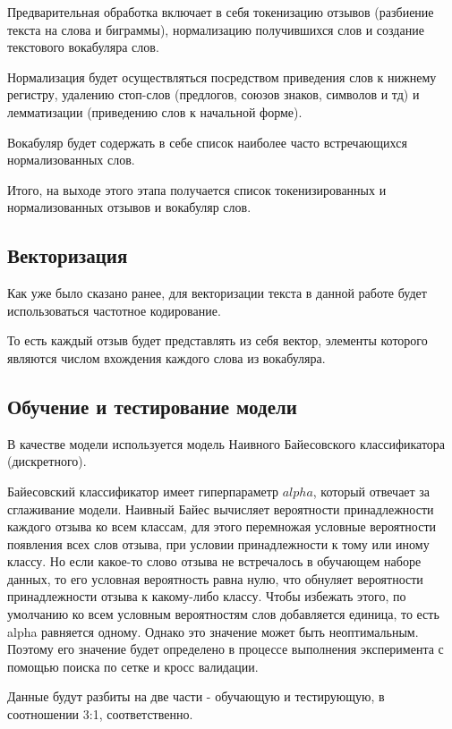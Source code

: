 \documentclass[a4paper,12pt]{article}
\begin{document}
	Предварительная обработка включает в себя токенизацию отзывов (разбиение текста на слова и биграммы), нормализацию получившихся слов и создание текстового вокабуляра слов.
	
	Нормализация будет осуществляться посредством приведения слов к нижнему регистру, удалению стоп-слов (предлогов, союзов знаков, символов и тд) и лемматизации (приведению слов к начальной форме).
	
	Вокабуляр будет содержать в себе список наиболее часто встречающихся нормализованных слов.
	
	Итого, на выходе этого этапа получается список токенизированных и нормализованных отзывов и вокабуляр слов.
	
	\subsection{Векторизация}
	
	Как уже было сказано ранее, для векторизации текста в данной работе будет использоваться частотное кодирование.
	
	То есть каждый отзыв будет представлять из себя вектор, элементы которого являются числом вхождения каждого слова из вокабуляра.
	
	\subsection{Обучение и тестирование модели}
	
	В качестве модели используется модель Наивного Байесовского классификатора (дискретного).
	
	Байесовский классификатор имеет гиперпараметр $alpha$, который отвечает за сглаживание модели. Наивный Байес вычисляет вероятности принадлежности каждого отзыва ко всем классам, для этого перемножая условные вероятности появления всех слов отзыва, при условии принадлежности к тому или иному классу. Но если какое-то слово отзыва не встречалось в обучающем наборе данных, то его условная вероятность равна нулю, что обнуляет вероятности принадлежности отзыва к какому-либо классу. Чтобы избежать этого, по умолчанию ко всем условным вероятностям слов добавляется единица, то есть alpha равняется одному. Однако это значение может быть неоптимальным. Поэтому его значение будет определено в процессе выполнения эксперимента с помощью поиска по сетке и кросс валидации.
	
	Данные будут разбиты на две части - обучающую и тестирующую, в соотношении 3:1, соответственно.
	
\end{document}
